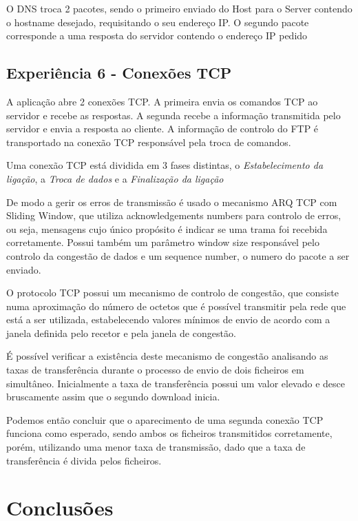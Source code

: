 \documentclass[11pt]{article}
\begin{document}
O DNS troca 2 pacotes, sendo o primeiro enviado do Host para o Server contendo o hostname desejado, requisitando o seu endereço IP. O segundo pacote corresponde a uma resposta do servidor contendo o endereço IP pedido

\subsection{Experiência 6 - Conexões TCP}

A aplicação abre 2 conexões TCP. A primeira envia os comandos TCP ao servidor e recebe as respostas. A segunda recebe a informação transmitida pelo servidor e envia a resposta ao cliente. A informação de controlo do FTP é transportado na conexão TCP responsável pela troca de comandos.

Uma conexão TCP está dividida em 3 fases distintas, o \emph{Estabelecimento da ligação}, a \emph{Troca de dados} e a \emph{Finalização da ligação}


De modo a gerir os erros de transmissão é usado o mecanismo ARQ TCP com Sliding Window, que utiliza acknowledgements numbers para controlo de erros, ou seja, mensagens cujo único propósito é indicar se uma trama foi recebida corretamente. Possui também um parâmetro window size responsável pelo controlo da congestão de dados e um sequence number, o numero do pacote a ser enviado.

O protocolo TCP possui um mecanismo de controlo de congestão, que consiste numa aproximação do número de octetos que é possível transmitir pela rede que está a ser utilizada, estabelecendo valores mínimos de envio de acordo com a janela definida pelo recetor e pela janela de congestão.

É possível verificar a existência deste mecanismo de congestão analisando as taxas de transferência durante o processo de envio de dois ficheiros em simultâneo. Inicialmente a taxa de transferência possui um valor elevado e desce bruscamente assim que o segundo download inicia.

Podemos então concluir que o aparecimento de uma segunda conexão TCP funciona como esperado, sendo ambos os ficheiros transmitidos corretamente, porém, utilizando uma menor taxa de transmissão, dado que a taxa de transferência é divida pelos ficheiros.


\section{Conclusões}
\end{document}
